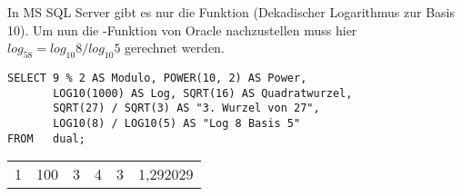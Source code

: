 In MS SQL Server gibt es nur die Funktion 
(Dekadischer Logarithmus zur Basis 10). Um nun die
-Funktion von Oracle nachzustellen muss hier $log_58
    = log_{10}8 / log_{10}5$ gerechnet werden.
\begin{lstlisting}[language=ms_sql,caption={Höhere Rechenarten in MS SQL Server},label=sql03_18]
SELECT 9 % 2 AS Modulo, POWER(10, 2) AS Power,
       LOG10(1000) AS Log, SQRT(16) AS Quadratwurzel,
       SQRT(27) / SQRT(3) AS "3. Wurzel von 27",
       LOG10(8) / LOG10(5) AS "Log 8 Basis 5"
FROM   dual;
        \end{lstlisting}
\begin{center}
    \begin{small}
        \tablehead{}
        \begin{mssql}
            \begin{supertabular}{llllll}
                1 & 100 & 3 & 4 & 3 & 1,292029 \\
            \end{supertabular}
        \end{mssql}
    \end{small}
\end{center}
\clearpage
\begin{literaturinternet}
    \item \cite{i97801}
    \item \cite{i77449}
    \item \cite{i84140}
    \item \cite{i77996}
    \item \cite{i78493}
    \item \cite{i78633}
    \item \cite{ms189818}
    \item \cite{ms178531}
    \item \cite{ms175121}
    \item \cite{ms174276}
    \item \cite{ms175003}
\end{literaturinternet}
